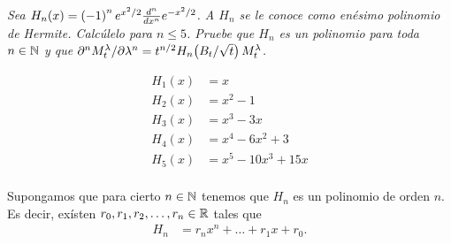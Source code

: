 \emph{
    Sea $H_n\!\left( x\right) =\left( -1\right) ^ne^{x^2/2}\frac{d^n}{dx^n}e^{-x^2/2}$.
    A $H_n$ se le conoce como en\'esimo polinomio de Hermite. Calc\'ulelo para 
    $n\leq 5$. Pruebe que $H_n$ es un polinomio para toda $n\in\mathbb{N}$ y que 
    $\partial^n M^\lambda_t/\partial \lambda^n=t^{n/2}H_n\!\left( B_t/\sqrt{t}\right) M^\lambda_t$.\pn
}

\afterstatement\pn

\begin{align}
        H_1(x)  &=  x                       \\
        H_2(x)  &=  x^2 - 1                 \\
        H_3(x)  &=  x^3 - 3x                \\
        H_4(x)  &=  x^4 - 6x^2 + 3          \\
        H_5(x)  &=  x^5 - 10x^3 + 15x       \\
\end{align}

Supongamos que para cierto $n \in \mathbb{N}$ tenemos que $H_n$ es un polinomio
de orden $n$. Es decir, exísten $r_0, r_1, r_2, \dots, r_n \in \mathbb{R}$ tales que
\begin{align}
        H_n &=  r_n x^n + \dots + r_1 x + r_0. 
\end{align}

